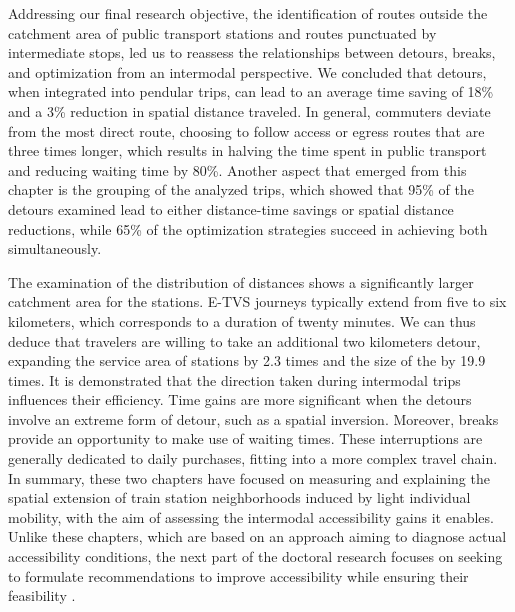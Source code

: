 \begin{refsegment}
Addressing our final research objective, the identification of routes outside the catchment area of public transport stations and routes punctuated by intermediate stops, led us to reassess the relationships between detours, breaks, and optimization from an intermodal perspective. We concluded that detours, when integrated into pendular trips, can lead to an average time saving of 18\% and a 3\% reduction in spatial distance traveled. In general, commuters deviate from the most direct route, choosing to follow access or egress routes that are three times longer, which results in halving the time spent in public transport and reducing waiting time by 80\%. Another aspect that emerged from this chapter is the grouping of the analyzed trips, which showed that 95\% of the detours examined lead to either distance-time savings or spatial distance reductions, while 65\% of the optimization strategies succeed in achieving both simultaneously.%

The examination of the distribution of distances shows a significantly larger catchment area for the stations. \acrshort{E-TVS} journeys typically extend from five to six kilometers, which corresponds to a duration of twenty minutes. We can thus deduce that travelers are willing to take an additional two kilometers detour, expanding the service area of stations by 2.3 times and the size of the  by 19.9 times. It is demonstrated that the direction taken during intermodal trips influences their efficiency. Time gains are more significant when the detours involve an extreme form of detour, such as a spatial inversion. Moreover, breaks provide an opportunity to make use of waiting times. These interruptions are generally dedicated to daily purchases, fitting into a more complex travel chain. In summary, these two chapters have focused on measuring and explaining the spatial extension of train station neighborhoods induced by light individual mobility, with the aim of assessing the intermodal accessibility gains it enables. Unlike these chapters, which are based on an  approach aiming to diagnose actual accessibility conditions, the next part of the doctoral research focuses on  seeking to formulate recommendations to improve accessibility while ensuring their feasibility \textcolor{blue}{\autocite[19]{levine_mobility_2019}}.%


\end{refsegment}
